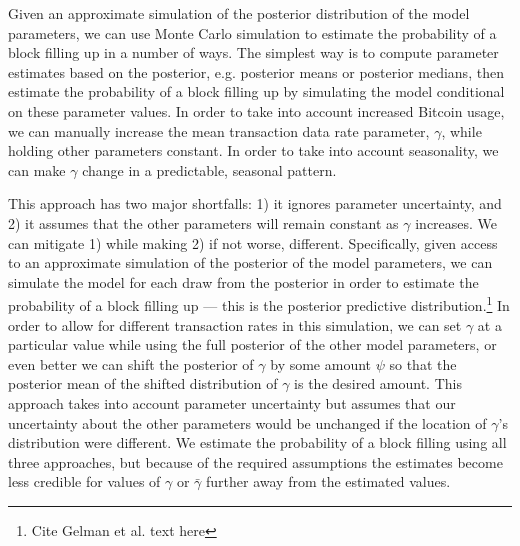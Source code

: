 \documentclass{article}
\begin{document}
Given an approximate simulation of the posterior distribution of the model parameters, we can use Monte Carlo simulation to estimate the probability of a block filling up in a number of ways. The simplest way is to compute parameter estimates based on the posterior, e.g. posterior means or posterior medians, then estimate the probability of a block filling up by simulating the model conditional on these parameter values. In order to take into account increased Bitcoin usage, we can manually increase the mean transaction data rate parameter, $\gamma$, while holding other parameters constant. In order to take into account seasonality, we can make $\gamma$ change in a predictable, seasonal pattern.

This approach has two major shortfalls: 1) it ignores parameter uncertainty, and 2) it assumes that the other parameters will remain constant as $\gamma$ increases. We can mitigate 1) while making 2) if not worse, different. Specifically, given access to an approximate simulation of the posterior of the model parameters, we can simulate the model for each draw from the posterior in order to estimate the probability of a block filling up --- this is the posterior predictive distribution.\footnote{Cite Gelman et al. text here} In order to allow for different transaction rates in this simulation, we can set $\gamma$ at a particular value while using the full posterior of the other model parameters, or even better we can shift the posterior of $\gamma$ by some amount $\psi$ so that the posterior mean of the shifted distribution of $\gamma$ is the desired amount. This approach takes into account parameter uncertainty but assumes that our uncertainty about the other parameters would be unchanged if the location of $\gamma$'s distribution were different. We estimate the probability of a block filling using all three approaches, but because of the required assumptions the estimates become less credible for values of $\gamma$ or $\bar{\gamma}$ further away from the estimated values.
\end{document}

